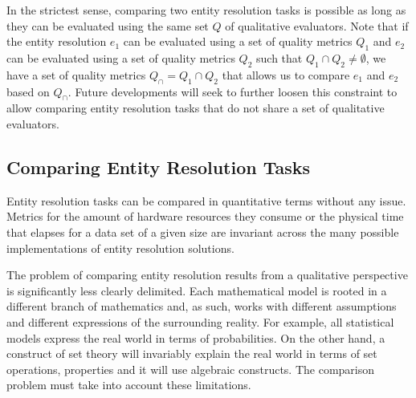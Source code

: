 \documentclass[lettersize,journal]{IEEEtran}
\begin{document}
    In the strictest sense, comparing two entity resolution tasks is possible as
    long as they can be evaluated using the same set $Q$ of qualitative
    evaluators.
    Note that if the entity resolution $e_1$ can be evaluated using a set of
    quality metrics $Q_1$ and $e_2$ can be evaluated using a set of quality
    metrics $Q_2$ such that $Q_1 \cap Q_2 \neq \emptyset$, we have a set of
    quality metrics $Q_\cap = Q_1 \cap Q_2$ that allows us to compare $e_1$ and
    $e_2$ based on $Q_\cap$.
    Future developments will seek to further loosen this constraint to allow
    comparing entity resolution tasks that do not share a set of qualitative
    evaluators.

    \subsection[cert]{Comparing Entity Resolution Tasks}\label{subsec:cert}

    Entity resolution tasks can be compared in quantitative terms without any
    issue.
    Metrics for the amount of hardware resources they consume or the physical
    time that elapses for a data set of a given size are invariant across the
    many possible implementations of entity resolution solutions.

    The problem of comparing entity resolution results from a qualitative
    perspective is significantly less clearly delimited.
    Each mathematical model is rooted in a different branch of mathematics and,
    as such, works with different assumptions and different expressions of the
    surrounding reality.
    For example, all statistical models express the real world in terms of
    probabilities.
    On the other hand, a construct of set theory will invariably explain the
    real world in terms of set operations, properties and it will use algebraic
    constructs.
    The comparison problem must take into account these limitations.
\end{document}
